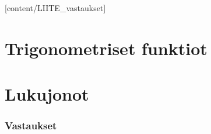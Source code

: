 [content/LIITE_vastaukset]

\part{Trigonometriset funktiot}


\part{Lukujonot}



\liitetyyli

\section{Vastaukset} 
